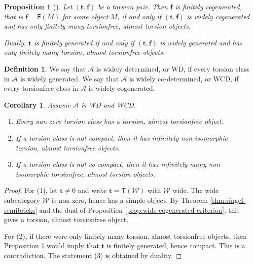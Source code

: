 \documentclass[11pt]{amsart}
\newtheorem{proposition}[theorem]{Proposition}
\newtheorem{corollary}[theorem]{Corollary}
\theoremstyle{definition}
\newtheorem{definition}[theorem]{Definition}
\newcommand{\A}{\mathcal A}
\newcommand{\W}{\mathcal W}
\newcommand{\T}{\mathsf T}
\newcommand{\F}{\mathsf F}
\begin{document}
\begin{proposition}[{\cite[Corollary 5.6]{RingelBrickChain}}]\label{prop:finitely-cogenerated}
Let \((\mathbf t,\mathbf f)\) be a torsion pair. Then \(\mathbf f\) is finitely cogenerated, that is \(\mathbf f=\F(M)\) for some object \(M\), if and only if \((\mathbf t,\mathbf f)\) is widely cogenerated and has only finitely many torsionfree, almost torsion objects.

Dually, \(\mathbf t\) is finitely generated if and only if \((\mathbf t,\mathbf f)\) is widely generated and has only finitely many torsion, almost torsionfree objects.
\end{proposition}

\begin{definition}
We say that \(\A\) is widely determined, or WD, if every torsion class in \(\A\) is widely generated. We say that \(\A\) is widely co-determined, or WCD, if every torsionfree class in \(\A\) is widely cogenerated.
\end{definition}

\begin{corollary}\label{cor:basic-wide-consequences}
Assume \(\A\) is WD and WCD.
\begin{enumerate}[label=\textup{(\arabic*)},leftmargin=2.5em]
\item Every non-zero torsion class has a torsion, almost torsionfree object.
\item If a torsion class is not compact, then it has infinitely non-isomorphic torsion, almost torsionfree objects.
\item If a torsion class is not co-compact, then it has infinitely many non-isomorphic torsionfree, almost torsion objects.
\end{enumerate}
\end{corollary}

\begin{proof}
For (1), let \(\mathbf t\neq 0\) and write \(\mathbf t=\T(\W)\) with \(\W\) wide. The wide subcategory \(\W\) is non-zero, hence has a simple object. By Theorem \ref{thm:ringel-semibricks} and the dual of Proposition \ref{prop:wide-cogenerated-criterion}, this gives a torsion, almost torsionfree object.

For (2), if there were only finitely many torsion, almost torsionfree objects, then Proposition \ref{prop:finitely-cogenerated} would imply that \(\mathbf t\) is finitely generated, hence compact. This is a contradiction. The statement (3) is obtained by duality.
\end{proof}
\end{document}
